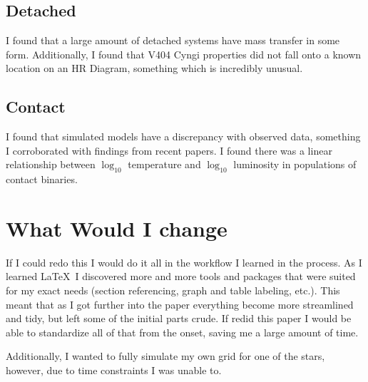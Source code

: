 \documentclass[12pt, a4paper]{article}
\begin{document}
    \subsection{Detached}
    I found that a large amount of detached systems have mass transfer in some form. Additionally, I found that V404 Cyngi properties did not fall onto a known location on an HR Diagram, something which is incredibly unusual. 
    \subsection{Contact}
    I found that simulated models have a discrepancy with observed data, something I corroborated with findings from recent papers. I found there was a linear relationship between $\log_{10}$ temperature and $\log_{10}$ luminosity in populations of contact binaries.
\section{What Would I change}

    If I could redo this I would do it all in the workflow I learned in the process. As I learned \LaTeX~I discovered more and more tools and packages that were suited for my exact needs (section referencing, graph and table labeling, etc.). This meant that as I got further into the paper everything become more streamlined and tidy, but left some of the initial parts crude. If redid this paper I would be able to standardize all of that from the onset, saving me a large amount of time.

    Additionally, I wanted to fully simulate my own grid for one of the stars, however, due to time constraints I was unable to. 
\end{document}
